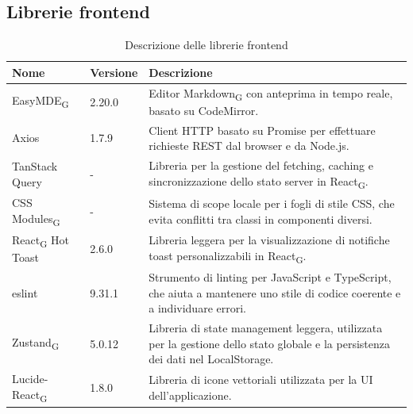 \documentclass[11pt,a4paper]{article}
\newcommand{\gls}[1]{#1\textsubscript{G}}
\begin{document}
\subsection{Librerie frontend}
\begin{table}[H]
    \centering
    \begin{tabular}{|p{}|p{}|p{}|}
        \hline
        \textbf{Nome} & \textbf{Versione} & \textbf{Descrizione} \\
        \hline
        \gls{EasyMDE} & 2.20.0 & Editor \gls{Markdown} con anteprima in tempo reale, basato su CodeMirror. \\
        \hline
        Axios & 1.7.9 & Client HTTP basato su Promise per effettuare richieste REST dal browser e da Node.js. \\
        \hline
        TanStack Query & - & Libreria per la gestione del fetching, caching e sincronizzazione dello stato server in \gls{React}. \\
        \hline
        \gls{CSS Modules} & - & Sistema di scope locale per i fogli di stile CSS, che evita conflitti tra classi in componenti diversi. \\
        \hline
        \gls{React} Hot Toast & 2.6.0 & Libreria leggera per la visualizzazione di notifiche toast personalizzabili in \gls{React}. \\
        \hline
        eslint & 9.31.1 & Strumento di linting per JavaScript e TypeScript, che aiuta a mantenere uno stile di codice coerente e a individuare errori. \\
        \hline
        \gls{Zustand} & 5.0.12 & Libreria di state management leggera, utilizzata per la gestione dello stato globale e la persistenza dei dati nel LocalStorage. \\
        \hline
        Lucide-\gls{React} & 1.8.0 & Libreria di icone vettoriali utilizzata per la UI dell'applicazione. \\
        \hline
    \end{tabular}
    \caption{Descrizione delle librerie frontend}
    \label{tab:librerie_frontend}
\end{table}
\end{document}
